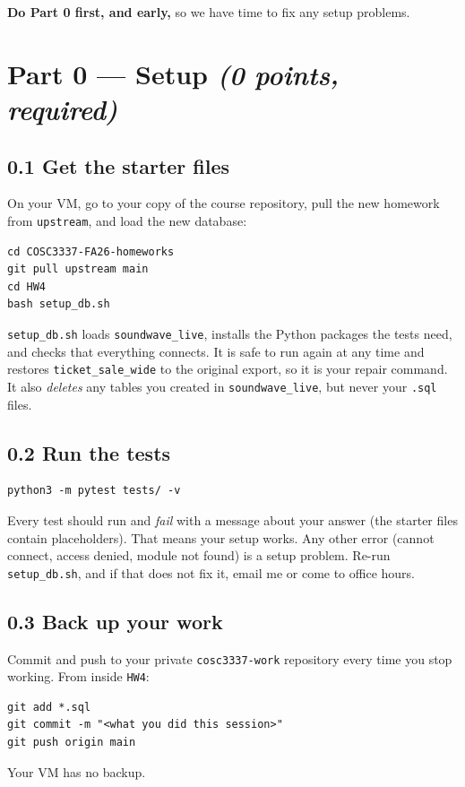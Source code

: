 \documentclass[11pt]{article}
\newcommand{\code}[1]{\texttt{#1}}
\begin{document}
\textbf{Do Part 0 first, and early,} so we have time to fix any setup problems.

\section*{Part 0 --- Setup \hfill \textit{(0 points, required)}}

\subsection*{0.1 Get the starter files}

On your VM, go to your copy of the course repository, pull the new homework
from \code{upstream}, and load the new database:
\begin{lstlisting}
cd COSC3337-FA26-homeworks
git pull upstream main
cd HW4
bash setup_db.sh
\end{lstlisting}

\code{setup\_db.sh} loads \code{soundwave\_live}, installs the Python packages
the tests need, and checks that everything connects. It is safe to run again at
any time and restores \code{ticket\_sale\_wide} to the original export, so it
is your repair command. It also \emph{deletes} any tables you created in
\code{soundwave\_live}, but never your \code{.sql} files.

\subsection*{0.2 Run the tests}

\begin{lstlisting}
python3 -m pytest tests/ -v
\end{lstlisting}

Every test should run and \emph{fail} with a message about your answer (the
starter files contain placeholders). That means your setup works. Any other
error (cannot connect, access denied, module not found) is a setup problem.
Re-run \code{setup\_db.sh}, and if that does not fix it, email me or come to
office hours.

\subsection*{0.3 Back up your work}

Commit and push to your private \code{cosc3337-work} repository every time you
stop working. From inside \code{HW4}:
\begin{lstlisting}
git add *.sql
git commit -m "<what you did this session>"
git push origin main
\end{lstlisting}
Your VM has no backup.
\end{document}
